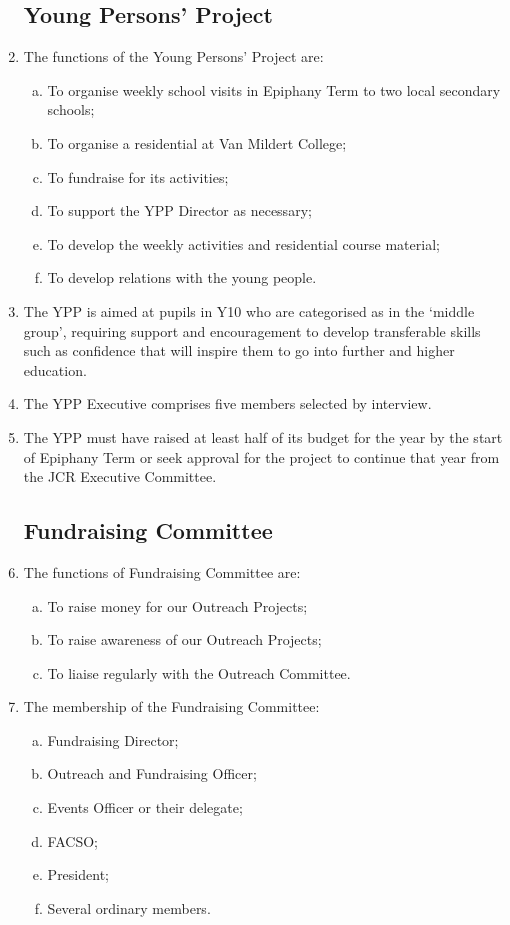 \documentclass[12pt]{article}
\begin{document}
\begin{enumerate}
    \subsection{Young Persons' Project}
    \item The functions of the Young Persons' Project are:
    \begin{enumerate}[(a)]
        \item To organise weekly school visits in Epiphany Term to two local secondary schools;
        \item To organise a residential at Van Mildert College;
        \item To fundraise for its activities;
        \item To support the YPP Director as necessary;
        \item To develop the weekly activities and residential course material;
        \item To develop relations with the young people.
    \end{enumerate}
    \item The YPP is aimed at pupils in Y10 who are categorised as in the `middle group', requiring support and encouragement to develop transferable skills such as confidence that will inspire them to go into further and higher education.
    \item The YPP Executive comprises five members selected by interview.
    \item The YPP must have raised at least half of its budget for the year by the start of Epiphany Term or seek approval for the project to continue that year from the JCR Executive Committee.
    \subsection{Fundraising Committee}
    \item The functions of Fundraising Committee are:
    \begin{enumerate}[(a)]
        \item To raise money for our Outreach Projects;
        \item To raise awareness of our Outreach Projects;
        \item To liaise regularly with the Outreach Committee.
    \end{enumerate}
    \item The membership of the Fundraising Committee:
    \begin{enumerate}[(a)]
        \item Fundraising Director;
        \item Outreach and Fundraising Officer;
        \item Events Officer or their delegate;
        \item FACSO;
        \item President;
        \item Several ordinary members.
    \end{enumerate}


\end{enumerate}
\end{document}
